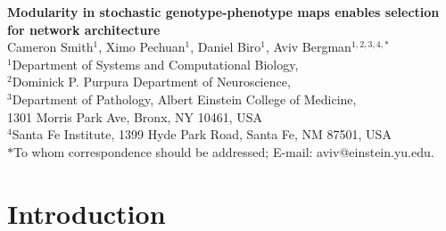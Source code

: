 



\let\ref\autoref

{}
\tableofcontents
\listoffigures
\listoftables
\pagebreak
{}

\begin{center}
{\Large
\textbf{Modularity in stochastic genotype-phenotype maps enables selection for network architecture}
}
\\[.5cm]
Cameron Smith$^{1}$,
Ximo Pechuan$^{1}$,
Daniel Biro$^{1}$,
Aviv Bergman$^{1,2,3,4, \ast}$
\\[.5cm]
$^1$Department of Systems and Computational Biology,\\
$^2$Dominick P. Purpura Department of Neuroscience,\\
$^3$Department of Pathology, Albert Einstein College of Medicine,\\
1301 Morris Park Ave, Bronx, NY 10461, USA\\
$^4$Santa Fe Institute, 1399 Hyde Park Road, Santa Fe, NM 87501, USA
\\[.5cm]
$\ast$To whom correspondence should be addressed; E-mail: aviv@einstein.yu.edu.
\end{center}

{\begin{quote} \bf

\end{quote}}
%

\section{Introduction}


